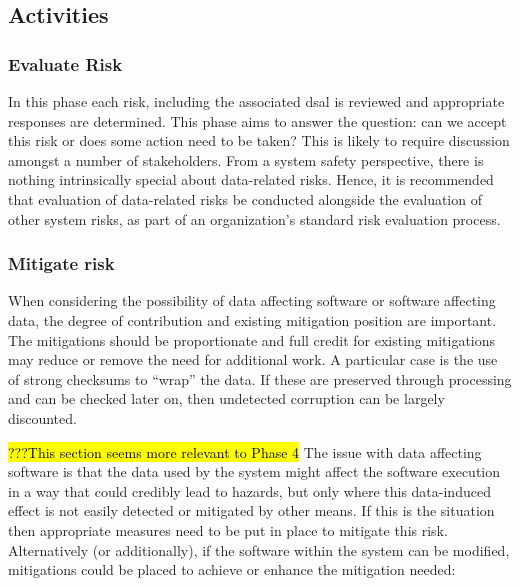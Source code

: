 \subsection{Activities}
\subsubsection{Evaluate Risk}
In this phase each risk, including the associated \gls{dsal} is reviewed and appropriate \glspl{response} are determined. This phase aims to answer the question: can we accept this risk or does some action need to be taken? This is likely to require discussion amongst a number of \glspl{stakeholder}. From a system safety perspective, there is nothing intrinsically special about data-related risks. Hence, it is recommended that evaluation of data-related risks be conducted alongside the evaluation of other system risks, as part of an organization's standard risk evaluation process.

\subsubsection{Mitigate risk}
When considering the possibility of data affecting software or software affecting data, the degree of contribution and existing \gls{mitigation} position are important. The \glspl{mitigation} should be proportionate and full credit for existing \glspl{mitigation} may reduce or remove the need for additional work. A particular case is the use of strong checksums to ``wrap'' the data. If these are preserved through processing and can be checked later on, then undetected  corruption can be largely discounted.

\hl{???This section seems more relevant to Phase 4}
The issue with data affecting software is that the data used by the system might affect the software execution in a way that could credibly lead to \glspl{hazard}, but only where this data-induced effect is not easily detected or mitigated by other means. If this is the situation then appropriate measures need to be put in place  to mitigate this risk. Alternatively (or additionally), if the software within the system can be modified, \glspl{mitigation} could be placed  to achieve or enhance the \gls{mitigation} needed:

